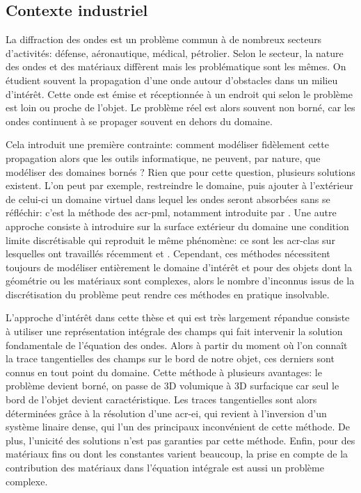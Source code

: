 \subsection*{Contexte industriel}
La diffraction des ondes est un problème commun à de nombreux secteurs d'activités: défense, aéronautique, médical, pétrolier.
Selon le secteur, la nature des ondes et des matériaux diffèrent mais les problématique sont les mêmes.
On étudient souvent la propagation d'une onde autour d'obstacles dans un milieu d’intérêt.
Cette onde est émise et réceptionnée à un endroit qui selon le problème est loin ou proche de l'objet.
Le problème réel est alors souvent non borné, car les ondes continuent à se propager souvent en dehors du domaine.

Cela introduit une première contrainte: comment modéliser fidèlement cette propagation alors que les outils informatique, ne peuvent, par nature, que modéliser des domaines bornés ?
Rien que pour cette question, plusieurs solutions existent.
L'on peut par exemple, restreindre le domaine, puis ajouter à l'extérieur de celui-ci un domaine virtuel dans lequel les ondes seront absorbées sans se réfléchir: c'est la méthode des \gls{acr-pml}, notamment introduite par \cite{berenger_perfectly_1994}.
Une autre approche consiste à introduire sur la surface extérieur du domaine une condition limite discrétisable qui reproduit le même phénomène: ce sont les \glspl{acr-cla} sur lesquelles ont travaillés récemment \cite{barucq_etude_1993} et \cite{duprat_conditions_2011}.
Cependant, ces méthodes nécessitent toujours de modéliser entièrement le domaine d’intérêt et pour des objets dont la géométrie ou les matériaux sont complexes, alors le nombre d'inconnus issus de la discrétisation du problème peut rendre ces méthodes en pratique insolvable.

L'approche d’intérêt dans cette thèse et qui est très largement répandue consiste à utiliser une représentation intégrale des champs qui fait intervenir la solution fondamentale de l'équation des ondes.
Alors à partir du moment où l'on connaît la trace tangentielles des champs sur le bord de notre objet, ces derniers sont connus en tout point du domaine.
Cette méthode à plusieurs avantages: le problème devient borné, on passe de 3D volumique à 3D surfacique car seul le bord de l'objet devient caractéristique.
Les traces tangentielles sont alors déterminées grâce à la résolution d'une \gls{acr-ei}, qui revient à l'inversion d'un système linaire dense, qui l'un des principaux inconvénient de cette méthode.
De plus, l'unicité des solutions n'est pas garanties par cette méthode.
Enfin, pour des matériaux fins ou dont les constantes varient beaucoup, la prise en compte de la contribution des matériaux dans l'équation intégrale est aussi un problème complexe.

